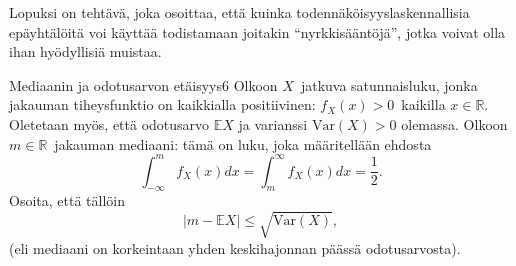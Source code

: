 \documentclass[11pt,a4paper]{amsart}
\newcommand{\R}{\mathbb{R}}
\newcommand{\E}{\mathbb{E}}
\newcommand{\1}{\mathbf{1}}
\begin{document}
Lopuksi on tehtävä, joka osoittaa, että kuinka todennäköisyyslaskennallisia epäyhtälöitä voi käyttää todistamaan joitakin ``nyrkkisääntöjä'', jotka voivat olla ihan hyödyllisiä muistaa.

\begin{Exercises}{Mediaanin ja odotusarvon etäisyys}{6}
Olkoon $X$ jatkuva satunnaisluku, jonka jakauman tiheysfunktio on kaikkialla positiivinen: $f_X(x)>0$ kaikilla $x\in \R$. Oletetaan myös, että odotusarvo $\E X$ ja varianssi $\mathrm{Var}(X)>0$ olemassa. Olkoon $m\in \R$ jakauman mediaani: tämä on luku, joka määritellään ehdosta 
\[
\int_{-\infty}^m f_X(x)dx=\int_m^\infty f_X(x)dx=\frac{1}{2}.
\]
Osoita, että tällöin
\[
|m-\E X|\leq \sqrt{\mathrm{Var}(X)},
\] 
(eli mediaani on korkeintaan yhden keskihajonnan päässä odotusarvosta).

\end{Exercises}
\end{document}
